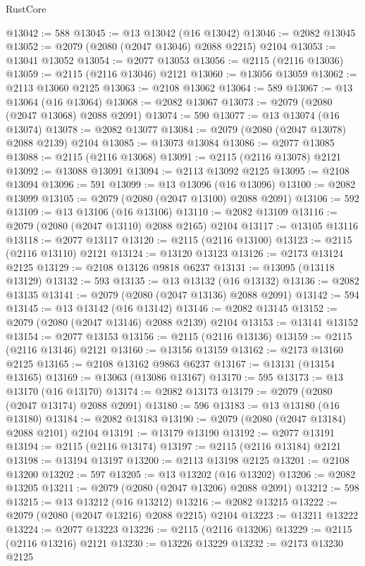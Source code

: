 \begin{lexlean}{RustCore}
\begin{coremodule}
@13042 := 588
@13045 := @13 @13042 (@16 @13042)
@13046 := @2082 @13045
@13052 := @2079 (@2080 (@2047 @13046) @2088 @2215) @2104
@13053 := @13041 @13052
@13054 := @2077 @13053
@13056 := @2115 (@2116 @13036)
@13059 := @2115 (@2116 @13046) @2121
@13060 := @13056 @13059
@13062 := @2113 @13060 @2125
@13063 := @2108 @13062
@13064 := 589
@13067 := @13 @13064 (@16 @13064)
@13068 := @2082 @13067
@13073 := @2079 (@2080 (@2047 @13068) @2088 @2091)
@13074 := 590
@13077 := @13 @13074 (@16 @13074)
@13078 := @2082 @13077
@13084 := @2079 (@2080 (@2047 @13078) @2088 @2139) @2104
@13085 := @13073 @13084
@13086 := @2077 @13085
@13088 := @2115 (@2116 @13068)
@13091 := @2115 (@2116 @13078) @2121
@13092 := @13088 @13091
@13094 := @2113 @13092 @2125
@13095 := @2108 @13094
@13096 := 591
@13099 := @13 @13096 (@16 @13096)
@13100 := @2082 @13099
@13105 := @2079 (@2080 (@2047 @13100) @2088 @2091)
@13106 := 592
@13109 := @13 @13106 (@16 @13106)
@13110 := @2082 @13109
@13116 := @2079 (@2080 (@2047 @13110) @2088 @2165) @2104
@13117 := @13105 @13116
@13118 := @2077 @13117
@13120 := @2115 (@2116 @13100)
@13123 := @2115 (@2116 @13110) @2121
@13124 := @13120 @13123
@13126 := @2173 @13124 @2125
@13129 := @2108 @13126 @9818 @6237
@13131 := @13095 (@13118 @13129)
@13132 := 593
@13135 := @13 @13132 (@16 @13132)
@13136 := @2082 @13135
@13141 := @2079 (@2080 (@2047 @13136) @2088 @2091)
@13142 := 594
@13145 := @13 @13142 (@16 @13142)
@13146 := @2082 @13145
@13152 := @2079 (@2080 (@2047 @13146) @2088 @2139) @2104
@13153 := @13141 @13152
@13154 := @2077 @13153
@13156 := @2115 (@2116 @13136)
@13159 := @2115 (@2116 @13146) @2121
@13160 := @13156 @13159
@13162 := @2173 @13160 @2125
@13165 := @2108 @13162 @9863 @6237
@13167 := @13131 (@13154 @13165)
@13169 := @13063 (@13086 @13167)
@13170 := 595
@13173 := @13 @13170 (@16 @13170)
@13174 := @2082 @13173
@13179 := @2079 (@2080 (@2047 @13174) @2088 @2091)
@13180 := 596
@13183 := @13 @13180 (@16 @13180)
@13184 := @2082 @13183
@13190 := @2079 (@2080 (@2047 @13184) @2088 @2101) @2104
@13191 := @13179 @13190
@13192 := @2077 @13191
@13194 := @2115 (@2116 @13174)
@13197 := @2115 (@2116 @13184) @2121
@13198 := @13194 @13197
@13200 := @2113 @13198 @2125
@13201 := @2108 @13200
@13202 := 597
@13205 := @13 @13202 (@16 @13202)
@13206 := @2082 @13205
@13211 := @2079 (@2080 (@2047 @13206) @2088 @2091)
@13212 := 598
@13215 := @13 @13212 (@16 @13212)
@13216 := @2082 @13215
@13222 := @2079 (@2080 (@2047 @13216) @2088 @2215) @2104
@13223 := @13211 @13222
@13224 := @2077 @13223
@13226 := @2115 (@2116 @13206)
@13229 := @2115 (@2116 @13216) @2121
@13230 := @13226 @13229
@13232 := @2173 @13230 @2125

\end{coremodule}
\end{lexlean}
